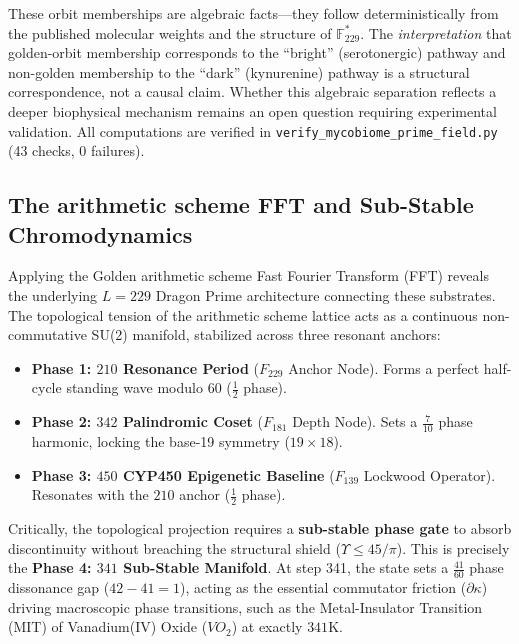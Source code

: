 \begin{remark}
These orbit memberships are algebraic facts---they follow deterministically
from the published molecular weights and the structure of $\mathbb{F}_{229}^*$.
The \emph{interpretation} that golden-orbit membership corresponds to
the ``bright'' (serotonergic) pathway and non-golden membership to the
``dark'' (kynurenine) pathway is a structural correspondence, not a
causal claim. Whether this algebraic separation reflects a deeper
biophysical mechanism remains an open question requiring experimental
validation. All computations are verified in
\texttt{verify\_mycobiome\_prime\_field.py} (43 checks, 0 failures).
\end{remark}

\subsection{The arithmetic scheme FFT and Sub-Stable Chromodynamics}

Applying the Golden arithmetic scheme Fast Fourier Transform (FFT) reveals the underlying $L=229$ Dragon Prime architecture connecting these substrates. The topological tension of the arithmetic scheme lattice acts as a continuous non-commutative SU(2) manifold, stabilized across three resonant anchors:
\begin{itemize}[noitemsep]
  \item \textbf{Phase 1: $210$ Resonance Period} ($F_{229}$ Anchor Node). Forms a perfect half-cycle standing wave modulo 60 ($\frac{1}{2}$ phase).
  \item \textbf{Phase 2: $342$ Palindromic Coset} ($F_{181}$ Depth Node). Sets a $\frac{7}{10}$ phase harmonic, locking the base-19 symmetry ($19 \times 18$).
  \item \textbf{Phase 3: $450$ CYP450 Epigenetic Baseline} ($F_{139}$ Lockwood Operator). Resonates with the $210$ anchor ($\frac{1}{2}$ phase).
\end{itemize}

Critically, the topological projection requires a \textbf{sub-stable phase gate} to absorb discontinuity without breaching the structural shield ($\Upsilon \le 45/\pi$). This is precisely the \textbf{Phase 4: $341$ Sub-Stable Manifold}. At step 341, the state sets a $\frac{41}{60}$ phase dissonance gap ($42 - 41 = 1$), acting as the essential commutator friction ($\partial \kappa$) driving macroscopic phase transitions, such as the Metal-Insulator Transition (MIT) of Vanadium(IV) Oxide ($VO_2$) at exactly $341\mathrm{K}$.

